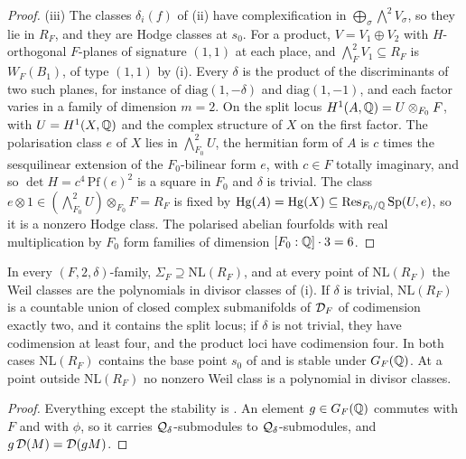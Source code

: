 \begin{proof}
(iii) The classes $\delta_{i}(f)$ of (ii) have
complexification in $\bigoplus_{\sigma}\bigwedge^{2}V_{\sigma}$, so they lie in
$R_{F}$, and they are Hodge classes at $s_{0}$. For a product,
$V=V_{1}\oplus V_{2}$ with $H$-orthogonal $F$-planes of signature $(1,1)$ at
each place, and $\bigwedge^{2}_{F}V_{1}\subseteq R_{F}$ is $W_{F}(B_{1})$, of
type $(1,1)$ by (i). Every $\delta$ is the product of the
discriminants of two such planes, for instance of $\mathrm{diag}(1,-\delta)$
and $\mathrm{diag}(1,-1)$, and each factor varies in a family of dimension
$m=2$. On the split locus $H^{1}(A,\mathbb{Q})=U\otimes_{F_{0}}F$, with
$U=H^{1}(X,\mathbb{Q})$ and the complex structure of $X$ on the first factor. The
polarisation class $e$ of $X$ lies in $\bigwedge^{2}_{F_{0}}U$, the hermitian
form of $A$ is $c$ times the sesquilinear extension of the $F_{0}$-bilinear
form $e$, with $c\in F$ totally imaginary, and so $\det H=c^{4}\,\mathrm{Pf}(e)^{2}$
is a square in $F_{0}$ and $\delta$ is trivial. The class
$e\otimes1\in(\bigwedge^{2}_{F_{0}}U)\otimes_{F_{0}}F=R_{F}$ is fixed by
$\operatorname{Hg}(A)=\operatorname{Hg}(X)\subseteq\operatorname{Res}_{F_{0}/\mathbb{Q}}\operatorname{Sp}(U,e)$, so it is a nonzero Hodge
class. The polarised abelian fourfolds with real multiplication by $F_{0}$
form families of dimension $[F_{0}:\mathbb{Q}]\cdot3=6$.
\end{proof}

\begin{corollary}\label{cor:quarticbase}
In every $(F,2,\delta)$-family, $\Sigma_{F}\supseteq\mathrm{NL}(R_{F})$, and at
every point of $\mathrm{NL}(R_{F})$ the Weil classes are the polynomials in
divisor classes of (i). If $\delta$ is trivial,
$\mathrm{NL}(R_{F})$ is a countable union of closed complex submanifolds of
$\mathcal{D}_{F}$ of codimension exactly two, and it contains the split locus; if
$\delta$ is not trivial, they have codimension at least four, and the product
loci have codimension four. In both cases $\mathrm{NL}(R_{F})$ contains the
base point $s_{0}$ of  and is stable under
$G_{F}(\mathbb{Q})$. At a point outside $\mathrm{NL}(R_{F})$ no nonzero Weil class is
a polynomial in divisor classes.
\end{corollary}

\begin{proof}
Everything except the stability is . An element
$g\in G_{F}(\mathbb{Q})$ commutes with $F$ and with $\phi$, so it carries
$\mathcal{Q}_{\delta}$-submodules to $\mathcal{Q}_{\delta}$-submodules, and
$g\,\mathcal{D}(M)=\mathcal{D}(gM)$.
\end{proof}

